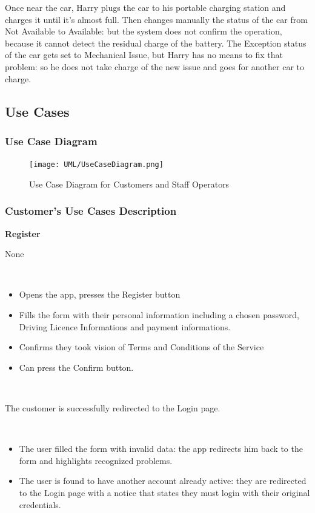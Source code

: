 \documentclass[11pt]{article} %
\begin{document}
Once near the car, Harry plugs the car to his portable charging station and charges it until it's almost full. Then changes manually the status of the car from Not Available to Available: but the system does not confirm the operation, because it cannot detect the residual charge of the battery. The Exception status of the car gets set to Mechanical Issue, but Harry has no means to fix that problem: so he does not take charge of the new issue and goes for another car to charge.


\subsection{Use Cases}

\subsubsection{Use Case Diagram}
\begin{figure}[H]
	\centering
	\texttt{[image: UML/UseCaseDiagram.png]}
	\caption{Use Case Diagram for Customers and Staff Operators}
\end{figure}

\subsubsection{Customer's Use Cases Description}

\begin{description}[noitemsep,topsep=0pt,parsep=0pt,partopsep=0pt]
	\item[Name:] \textbf{Register}
	\item[Entry Conditions:] None
	\item[Flow Of Events:] \hfill\
	\begin{itemize}
		\item Opens the app, presses the Register button
		\item Fills the form with their personal information including a chosen password, Driving Licence Informations and payment informations.
		\item Confirms they took vision of Terms and Conditions of the Service 
		\item Can press the Confirm button.
	\end{itemize} \hfill\
	\item[Exit conditions:] The customer is successfully redirected to the Login page.
	\item[Exceptions:]  \hfill\
	\begin{itemize}
		\item The user filled the form with invalid data: the app redirects him back to the form and highlights recognized problems. 
		\item The user is found to have another account already active: they are redirected to the Login page with a notice that states they must login with their original credentials.
	\end{itemize}
\end{description}
\hfill\
\end{document}
